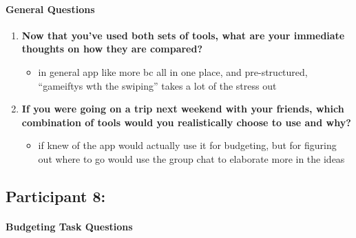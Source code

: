 \documentclass[12pt,a4paper]{article}
\begin{document}
\paragraph{General Questions}

\begin{enumerate}
    \item \textbf{Now that you've used both sets of tools, what are your immediate thoughts on how they are compared?}
    
    \begin{itemize}
        \item in general app like more bc all in one place, and pre-structured, ``gameiftys wth the swiping'' takes a lot of the stress out
    \end{itemize}
    
    \item \textbf{If you were going on a trip next weekend with your friends, which combination of tools would you realistically choose to use and why?}
    
    \begin{itemize}
        \item if knew of the app would actually use it for budgeting, but for figuring out where to go would use the group chat to elaborate more in the ideas
    \end{itemize}
\end{enumerate}

\subsection{Participant 8:}
\paragraph{Budgeting Task Questions}
\end{document}
